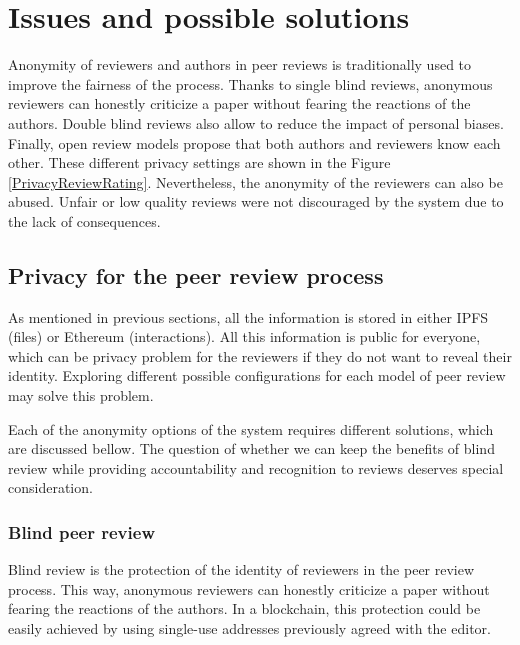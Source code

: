 \section{Issues and possible solutions}
\label{sec:privacyReview}


Anonymity of reviewers and authors in peer reviews is traditionally used to
improve the fairness of the process. Thanks to single blind reviews, anonymous
reviewers can honestly criticize a paper without fearing the reactions of the
authors. Double blind reviews also allow to reduce the impact of personal
biases. Finally, open review models propose that both authors and reviewers know
each other. These different privacy settings are shown in the Figure
\ref{PrivacyReviewRating}. Nevertheless, the anonymity of the reviewers can also
be abused. Unfair or low quality reviews were not discouraged by the system due
to the lack of consequences.

\subsection{Privacy for the peer review process}
\label{sec:privacy-peer-review}

As mentioned in previous sections, all the information is stored in either IPFS
(files) or Ethereum (interactions). All this information is public for everyone,
which can be privacy problem for the reviewers if they do not want to reveal
their identity. Exploring different possible configurations for each model of
peer review may solve this problem.

Each of the anonymity options of the system requires different solutions, which
are discussed bellow. The question of whether we can keep the benefits of blind
review while providing accountability and recognition to reviews deserves
special consideration.

\subsubsection*{Blind peer review}
Blind review is the protection of the identity of reviewers in the peer review
process. This way, anonymous reviewers can honestly criticize a paper without
fearing the reactions of the authors. In a blockchain, this protection could be
easily achieved by using single-use addresses previously agreed with the editor.


